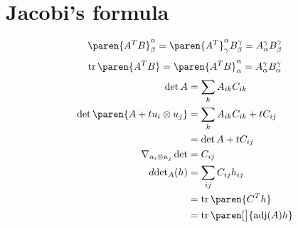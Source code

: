 \documentclass{scrartcl}
\DeclareMathOperator{\trace}{tr}
\DeclareMathOperator{\adj}{adj}
\begin{document}
\section{Jacobi's formula}
\[
  \paren{A^TB}^\alpha_\beta = \paren{A^T}^\alpha_\gamma B^\gamma_\beta = A^\gamma_\alpha B^\gamma_\beta
\]
\[
  \trace\paren{A^TB} = \paren{A^TB}^\alpha_\alpha = A^\gamma_\alpha B^\gamma_\alpha
\]
\begin{align*}
  \det{A} &= \sum_{k} A_{ik} C_{ik} \\
  \det\paren{A+tu_i\otimes u_j} &=  \sum_{k}A_{ik}C_{ik} + tC_{ij} \\
  &=\det A + tC_{ij} \\
  \nabla_{u_i\otimes u_j} \det &= C_{ij} \\
  d{\det}_{A}(h) &= \sum_{ij} C_{ij} h_{ij} \\
          & = \trace\paren{C^Th} \\
          &=\trace\paren[\big]{\adj(A)h}
\end{align*}
\end{document}

